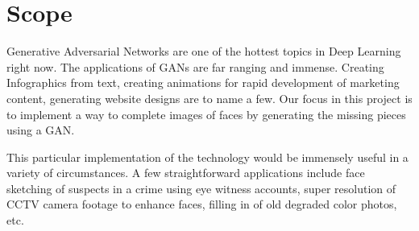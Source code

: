 {\chapter{Scope}\label{ch:scope}}
Generative Adversarial Networks are one of the hottest topics in Deep Learning right now. The applications of GANs are far ranging and immense. Creating Infographics from text, creating animations for rapid development of marketing content, generating website designs are to name a few. Our focus in this project is to implement a way to complete images of faces by generating the missing pieces using a GAN. 

\par\bigskip
This particular implementation of the technology would be immensely useful in a variety of circumstances. A few straightforward applications include face sketching of suspects in a crime using eye witness accounts, super resolution of CCTV camera footage to enhance faces, filling in of old degraded color photos, etc.